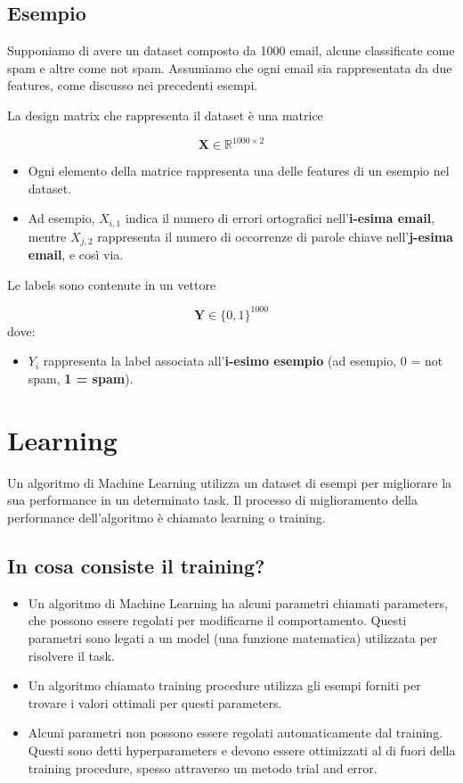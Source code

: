 \subsection{Esempio}

Supponiamo di avere un dataset composto da 1000 email, alcune classificate come spam e altre come not spam. Assumiamo che ogni email sia rappresentata da due features, come discusso nei precedenti esempi.

\noindent
La design matrix che rappresenta il dataset è una matrice

$$ \mathbf{X} \in \mathbb{R}^{1000 \times 2} $$

\begin{itemize}
\item Ogni elemento della matrice rappresenta una delle features di un esempio nel dataset.
\item Ad esempio, $ {X}_{i,1} $ indica il numero di errori ortografici nell’\textbf{i-esima email}, mentre $ {X}_{j,2} $ rappresenta il numero di occorrenze di parole chiave nell’\textbf{j-esima email}, e così via.
\end{itemize}

\noindent
Le labels sono contenute in un vettore

$$ \mathbf{Y} \in \{0,1\}^{1000} $$
dove:

\begin{itemize}
\item $ Y_i $ rappresenta la label associata all’\textbf{i-esimo esempio} (ad esempio, 0 = not spam, \textbf{1 = spam}).
\end{itemize}

\section{Learning}

Un algoritmo di Machine Learning utilizza un dataset di esempi per migliorare la sua performance in un determinato task. Il processo di miglioramento della performance dell'algoritmo è chiamato learning o training.

\subsection{In cosa consiste il training?}

\begin{itemize}
\item Un algoritmo di Machine Learning ha alcuni parametri chiamati parameters, che possono essere regolati per modificarne il comportamento. Questi parametri sono legati a un model (una funzione matematica) utilizzata per risolvere il task.
\item Un algoritmo chiamato training procedure utilizza gli esempi forniti per trovare i valori ottimali per questi parameters.
\item Alcuni parametri non possono essere regolati automaticamente dal training. Questi sono detti hyperparameters e devono essere ottimizzati al di fuori della training procedure, spesso attraverso un metodo trial and error.
\end{itemize}

